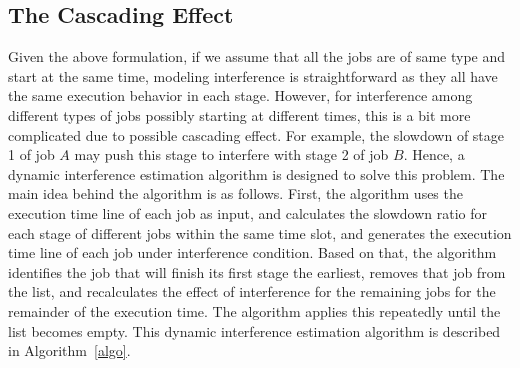 \subsection{The Cascading Effect}
Given the above formulation, if we assume that all the jobs are of same type and start at the same time, modeling interference is straightforward as they all have the same execution behavior in each stage. However, for interference among different types of jobs possibly starting at different times, this is a bit more complicated due to possible cascading effect. For example, the slowdown of stage 1 of job $A$ may push this stage to interfere with stage 2 of job $B$. Hence, a dynamic interference estimation algorithm is designed to solve this problem. The main idea behind the algorithm is as follows. First, the algorithm uses the execution time line of each job as input, and calculates the slowdown ratio for each stage of different jobs within the same time slot, and generates the execution time line of each job under interference condition. Based on that, the algorithm identifies the job that will finish its first stage the earliest, removes that job from the list, and recalculates the effect of interference for the remaining jobs for the remainder of the execution time. The algorithm applies this repeatedly until the list becomes empty. This dynamic interference estimation algorithm is described in Algorithm~\ref{algo}.

